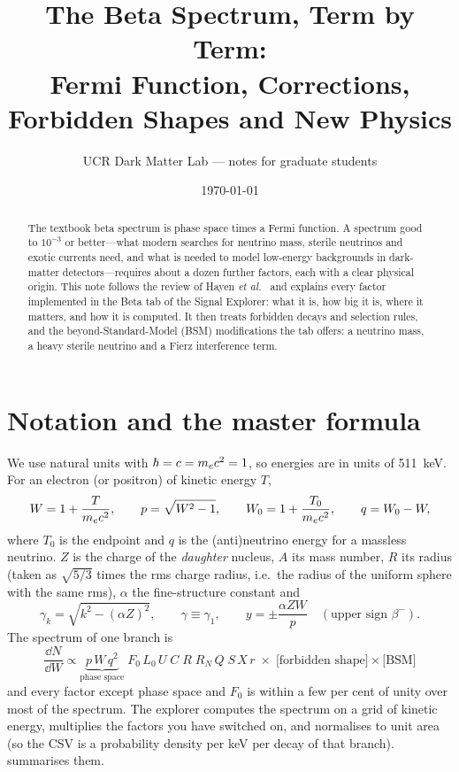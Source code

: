 
\title{The Beta Spectrum, Term by Term:\\ Fermi Function, Corrections, Forbidden Shapes and New Physics}
\author{UCR Dark Matter Lab --- notes for graduate students}
\date{\today}

\maketitle
\seriesnote

\begin{abstract}
The textbook beta spectrum is phase space times a Fermi function. A spectrum good to $10^{-3}$ or better---what modern searches for neutrino mass, sterile neutrinos and exotic currents need, and what is needed to model low-energy backgrounds in dark-matter detectors---requires about a dozen further factors, each with a clear physical origin. This note follows the review of Hayen \emph{et al.}\ \cite{hayen} and explains every factor implemented in the Beta tab of the Signal Explorer: what it is, how big it is, where it matters, and how it is computed. It then treats forbidden decays and selection rules, and the beyond-Standard-Model (BSM) modifications the tab offers: a neutrino mass, a heavy sterile neutrino and a Fierz interference term.
\end{abstract}
\tableofcontents

\section{Notation and the master formula}
We use natural units with $\hbar = c = m_e c^2 = 1$, so energies are in units of \SI{511}{keV}. For an electron (or positron) of kinetic energy $T$,
\begin{equation}
W = 1 + \frac{T}{m_e c^2}, \qquad p = \sqrt{W^2-1}, \qquad W_0 = 1 + \frac{T_0}{m_e c^2}, \qquad q = W_0 - W,
\end{equation}
where $T_0$ is the endpoint and $q$ is the (anti)neutrino energy for a massless neutrino. $Z$ is the charge of the \emph{daughter} nucleus, $A$ its mass number, $R$ its radius (taken as $\sqrt{5/3}$ times the rms charge radius, i.e.\ the radius of the uniform sphere with the same rms), $\alpha$ the fine-structure constant and
\begin{equation}
\gamma_k = \sqrt{k^2 - (\alpha Z)^2}, \qquad \gamma \equiv \gamma_1, \qquad y = \pm\frac{\alpha Z W}{p}\quad(\text{upper sign } \beta^-).
\end{equation}
The spectrum of one branch is
\begin{equation}
\boxed{\;\frac{\dd N}{\dd W} \propto
\underbrace{p\,W\,q^2}_{\text{phase space}}\;
F_0\,L_0\,U\;C\;R\;R_N\,Q\;S\,X\,r\;\times\;\big[\text{forbidden shape}\big]\times\big[\text{BSM}\big]\;}
\label{eq:master}
\end{equation}
and every factor except phase space and $F_0$ is within a few per cent of unity over most of the spectrum. The explorer computes the spectrum on a grid of kinetic energy, multiplies the factors you have switched on, and normalises to unit area (so the CSV is a probability density per keV per decay of that branch).  summarises them.

